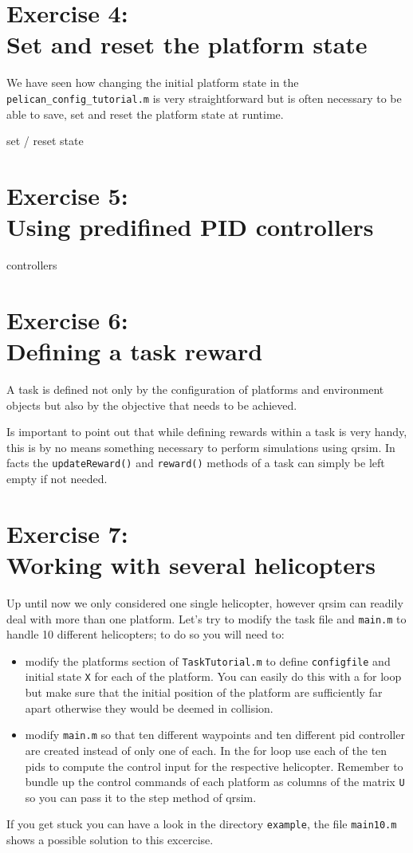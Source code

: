 \documentclass[a4paper,11pt]{article}
\begin{document}
\section*{Exercise 4:\\Set and reset the platform state}

We have seen how changing the initial platform state in the \texttt{pelican\_config\_tutorial.m} is very straightforward but is often necessary to be able to save, set and reset the platform state at runtime.

  
set / reset state


\section*{Exercise 5:\\Using predifined PID controllers}


controllers


\section*{Exercise 6:\\Defining a task reward}

A task is defined not only by the configuration of platforms and environment objects but also by the  objective that needs to be achieved.


Is important to point out that while defining rewards within a task is very handy, this is by no means something necessary to perform simulations using qrsim. In facts the \texttt{updateReward()} and \texttt{reward()} methods of a task can simply be left empty if not needed.

\section*{Exercise 7:\\Working with several helicopters}

Up until now we only considered one single helicopter, however qrsim can readily deal with more than one platform.
Let's try to modify the task file and \texttt{main.m} to handle 10 different helicopters; to do so you will need to:
\begin{itemize}
 \item modify the platforms section of \texttt{TaskTutorial.m} to define \texttt{configfile} and initial state \texttt{X} for each of the platform. You can easily do this with a for loop but make sure that the initial position of the platform are sufficiently far apart otherwise they would be deemed in collision.
\item modify \texttt{main.m} so that ten different waypoints and ten different pid controller are created instead of only one of each. In the for loop use each of the ten pids to compute the control input for the respective helicopter. Remember to bundle up the control commands of each platform as columns of the matrix \texttt{U} so you can pass it to the step method of qrsim.
\end{itemize}
If you get stuck you can have a look in the directory \texttt{example}, the file \texttt{main10.m} shows a possible solution to this excercise.
\end{document}
